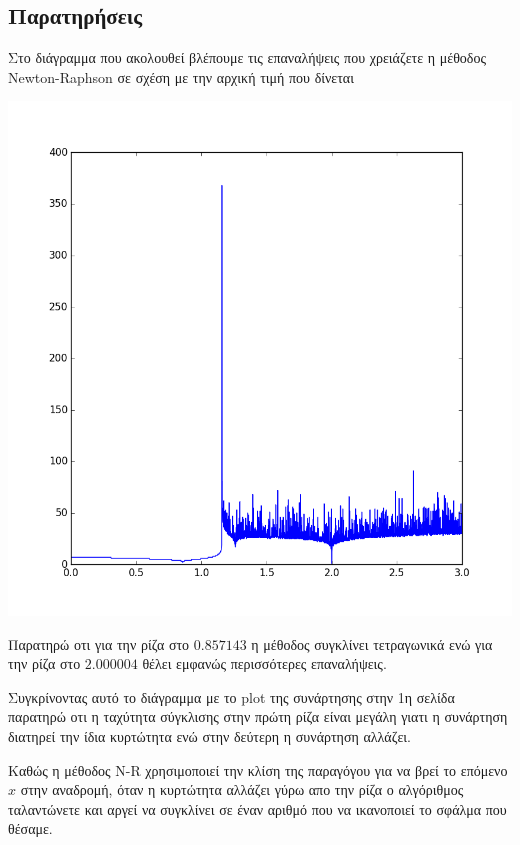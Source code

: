 \newpage
\subsection{Παρατηρήσεις}
Στο διάγραμμα που ακολουθεί βλέπουμε τις επαναλήψεις που
χρειάζετε η μέθοδος Newton-Raphson σε σχέση με την αρχική τιμή
που δίνεται

\begin{center}
  \includegraphics[scale = 0.7]{ex1/starting_point-loops.png}
\end{center}

Παρατηρώ οτι για την ρίζα στο $0.857143$ η μέθοδος συγκλίνει τετραγωνικά
ενώ για την ρίζα στο $2.000004$ θέλει εμφανώς περισσότερες επαναλήψεις.

Συγκρίνοντας αυτό το διάγραμμα με το plot της συνάρτησης στην 1η σελίδα
παρατηρώ οτι η ταχύτητα σύγκλισης στην πρώτη ρίζα είναι μεγάλη γιατι η
συνάρτηση διατηρεί την ίδια κυρτώτητα ενώ στην δεύτερη η συνάρτηση αλλάζει.

Καθώς η μέθοδος N-R χρησιμοποιεί την κλίση της παραγόγου για να βρεί το
επόμενο $x$ στην αναδρομή, όταν η κυρτώτητα αλλάζει γύρω απο την ρίζα
ο αλγόριθμος ταλαντώνετε και αργεί να συγκλίνει σε έναν αριθμό που να ικανοποιεί
το σφάλμα που θέσαμε.
